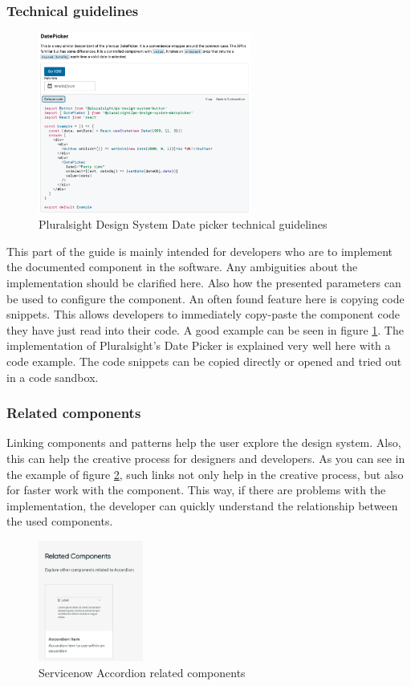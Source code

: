 \subsubsection{Technical guidelines} \label{tech_guideline}
\begin{figure}
	\includegraphics[width=7cm]{images/pluralsight_date-picker_technical.png}
	\caption{Pluralsight Design System Date picker technical guidelines \cite{pluralsight_ds_nodate}}
	\label{pluralsight_date_picker}
	\end{figure}
This part of the guide is mainly intended for developers who are to implement the documented component in the software. Any ambiguities about the implementation should be clarified here.  \cite{macdonald_practical_2019} Also how the presented parameters can be used to configure the component. An often found feature here is copying code snippets. This allows developers to immediately copy-paste the component code they have just read into their code. \cite{vesselov_building_2019} A good example can be seen in figure \ref{pluralsight_date_picker}. The implementation of Pluralsight's Date Picker is explained very well here with a code example. The code snippets can be copied directly or opened and tried out in a code sandbox.

\subsubsection{Related components} Linking components and patterns help the user explore the design system. Also, this can help the creative process for designers and developers.  \cite{vesselov_building_2019} As you can see in the example of figure \ref{servicenow_accordion}, such links not only help in the creative process, but also for faster work with the component. This way, if there are problems with the implementation, the developer can quickly understand the relationship between the used components.
\begin{figure}[htbp]
\centerline{\includegraphics[height=150px]{images/servicenow_accordion_related.png}}
\caption{Servicenow Accordion related components \cite{servicenow_servicenow_nodate}}
\label{servicenow_accordion}
\end{figure}

